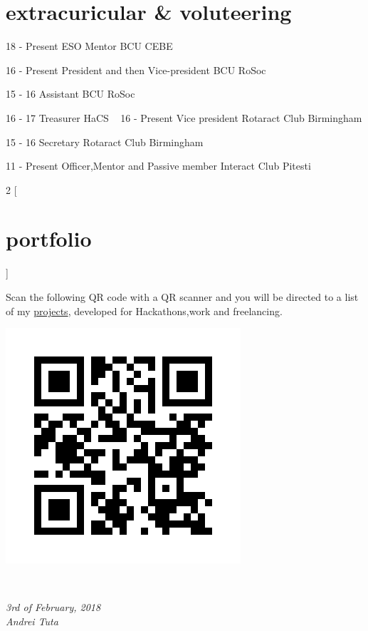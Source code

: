 \documentclass[]{friggeri-cv}
\begin{document}
\section{extracuricular \& voluteering}
\begin{entrylist}
    
    
    \entry
    {18 - Present}
    {ESO Mentor}
    {BCU CEBE}
    
    \entry
    {16 - Present}
    {President and then Vice-president}
    {BCU RoSoc}
    
    \entry
    {15 - 16}
    {Assistant}
    {BCU RoSoc}
    
     \entry
    {16 - 17}
    {Treasurer}
    {HaCS}
    ~ 
     \entry
    {16 - Present}
    {Vice president}
    {Rotaract Club Birmingham}
    
    \entry
    {15 - 16}
    {Secretary}
    {Rotaract Club Birmingham}
    ~
    
    \entry
    {11 - Present}
    {Officer,Mentor and Passive member}
    {Interact Club Pitesti}
    ~
\end{entrylist}

\begin{multicols}{2}
[
\section{portfolio}
]

Scan the following QR code with a QR scanner and you will be directed to a list of my 
\hyperref[https://github.com/andreituta/cv]{projects}, developed for Hackathons,work and freelancing.
    
   \begin{flushright}
   \includegraphics[scale=0.30]{img/static_qr_code_without_logo.jpg}
\end{flushright}

   
\end{multicols}
\\
\begin{flushleft}
\emph{3rd of February, 2018}
\\
\emph{Andrei Tuta}
\end{flushleft}
\end{document}

